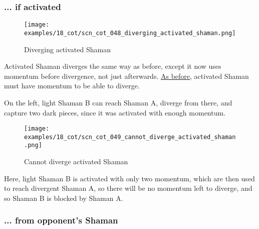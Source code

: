 \clearpage %

\subsubsection*{... if activated}
\label{sec:Conquest of Tlalocan/Divergence/... if activated}

\vspace*{-0.7\baselineskip}
\noindent
\begin{wrapfigure}[12]{l}{0.4\textwidth}
\centering
\texttt{[image: examples/18\_cot/scn\_cot\_048\_diverging\_activated\_shaman.png]}
\vspace*{-0.4\baselineskip}
\caption{Diverging activated Shaman}
\label{fig:scn_cot_048_diverging_activated_shaman}
\end{wrapfigure}
Activated Shaman diverges the same way as before, except it now uses momentum before
divergence, not just afterwards. \newline
\indent
\hyperref[fig:scn_cot_032_diverging_activated_piece_init]{As before}, activated
Shaman must have momentum to be able to diverge.

On the left, light Shaman B can reach Shaman A, diverge from there, and capture
two dark pieces, since it was activated with enough momentum.

\noindent
\begin{wrapfigure}[6]{l}{0.4\textwidth}
\centering
\texttt{[image: examples/18\_cot/scn\_cot\_049\_cannot\_diverge\_activated\_shaman.png]}
\vspace*{-0.4\baselineskip}
\caption{Cannot diverge activated Shaman}
\label{fig:scn_cot_049_cannot_diverge_activated_shaman}
\end{wrapfigure}
Here, light Shaman B is activated with only two momentum, which are then used
to reach divergent Shaman A, so there will be no momentum left to diverge, and
so Shaman B is blocked by Shaman A.

\clearpage %

\subsubsection*{... from opponent's Shaman}
\label{sec:Conquest of Tlalocan/Divergence/... from opponent's Shaman}

